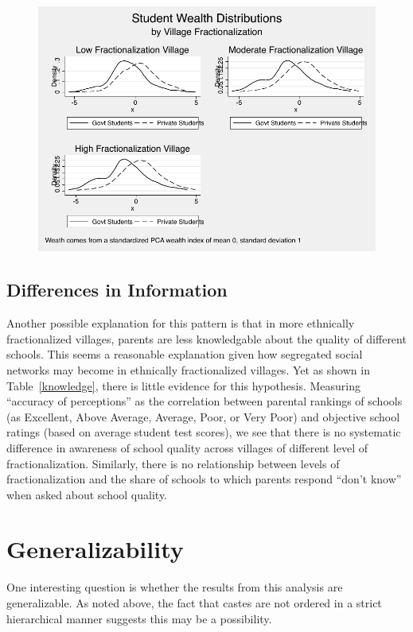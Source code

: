 \documentclass[12pt]{article}
\begin{document}
\begin{figure}[htb]
	\begin{center}
	\caption{}\label{wealthbyfrac}
	\includegraphics[scale=1.0]{graphs/wealth_by_frac.pdf}
	\end{center}
\end{figure}

\subsection{Differences in Information}\label{}
Another possible explanation for this pattern is that in more ethnically fractionalized villages, parents are less knowledgable about the quality of different schools. This seems a reasonable explanation given how segregated social networks may become in ethnically fractionalized villages. Yet as shown in Table~\ref{knowledge}, there is little evidence for this hypothesis. Measuring ``accuracy of perceptions'' as the correlation between parental rankings of schools (as Excellent, Above Average, Average, Poor, or Very Poor) and objective school ratings (based on average student test scores), we see that there is no systematic difference in awareness of school quality across villages of different level of fractionalization. Similarly, there is no relationship between levels of fractionalization and the share of schools to which parents respond ``don't know'' when asked about school quality. 





\section{Generalizability}\label{india}
One interesting question is whether the results from this analysis are generalizable. As noted above, the fact that castes are not ordered in a strict hierarchical manner suggests this may be a possibility. 
\end{document}

